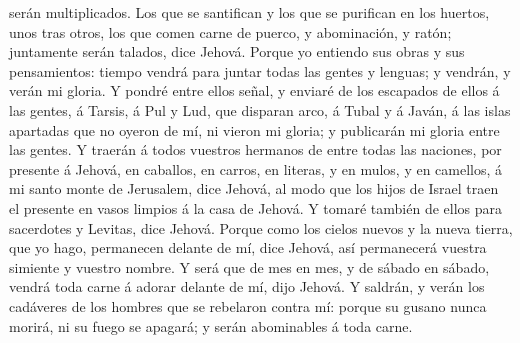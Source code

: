 serán multiplicados.  Los que se santifican y los que se
purifican en los huertos, unos tras otros, los que comen carne de
puerco, y abominación, y ratón; juntamente serán talados, dice Jehová.
 Porque yo entiendo sus obras y sus pensamientos: tiempo
vendrá para juntar todas las gentes y lenguas; y vendrán, y verán mi
gloria.  Y pondré entre ellos señal, y enviaré de los
escapados de ellos á las gentes, á Tarsis, á Pul y Lud, que disparan
arco, á Tubal y á Javán, á las islas apartadas que no oyeron de mí, ni
vieron mi gloria; y publicarán mi gloria entre las gentes. 
Y traerán á todos vuestros hermanos de entre todas las naciones, por
presente á Jehová, en caballos, en carros, en literas, y en mulos, y en
camellos, á mi santo monte de Jerusalem, dice Jehová, al modo que los
hijos de Israel traen el presente en vasos limpios á la casa de Jehová.
 Y tomaré también de ellos para sacerdotes y Levitas, dice
Jehová.  Porque como los cielos nuevos y la nueva tierra,
que yo hago, permanecen delante de mí, dice Jehová, así permanecerá
vuestra simiente y vuestro nombre.  Y será que de mes en
mes, y de sábado en sábado, vendrá toda carne á adorar delante de mí,
dijo Jehová.  Y saldrán, y verán los cadáveres de los
hombres que se rebelaron contra mí: porque su gusano nunca morirá, ni su
fuego se apagará; y serán abominables á toda carne.
